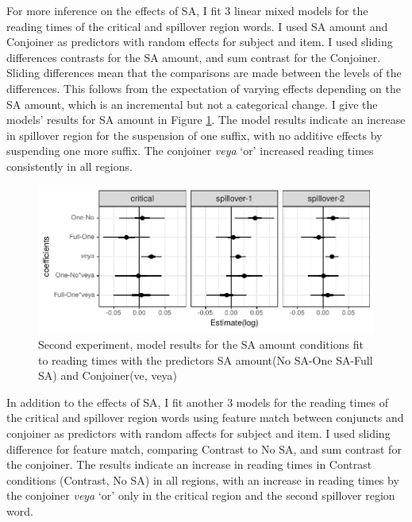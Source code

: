 For more inference on the effects of SA, I fit 3 linear mixed models for the reading times of the critical and spillover region words. I used SA amount and Conjoiner as predictors with random effects for subject and item. I used sliding differences contrasts for the SA amount, and sum contrast for the Conjoiner. Sliding differences mean that the comparisons are made between the levels of the differences. This follows from the expectation of varying effects depending on the SA amount, which is an incremental but not a categorical change. I give the models' results for SA amount in Figure \ref{fig:targetmodels}. The model results indicate an increase in spillover region for the suspension of one suffix, with no additive effects by suspending one more suffix. The conjoiner \textit{veya} `or' increased reading times consistently in all regions.

\begin{knitrout}
\color{fgcolor}\begin{figure}[hbt!]

{\centering \includegraphics[]{experiments/selfpaced/report/figure/targetmodels-1.pdf} 

}

\caption[Second experiment, model results for the SA amount conditions fit to reading times with the predictors SA amount(No SA-One SA-Full SA) and Conjoiner(ve, veya)]{Second experiment, model results for the SA amount conditions fit to reading times with the predictors SA amount(No SA-One SA-Full SA) and Conjoiner(ve, veya)}\label{fig:targetmodels}
\end{figure}


\end{knitrout}

In addition to the effects of SA, I fit another 3 models for the reading times of the critical and spillover region words using feature match between conjuncts and conjoiner as predictors with random affects for subject and item. I used sliding difference for feature match, comparing Contrast to No SA, and sum contrast for the conjoiner. The results indicate an increase in reading times in Contrast conditions (Contrast, No SA) in all regions, with an increase in reading times by the conjoiner \textit{veya} `or' only in the critical region and the second spillover region word.

